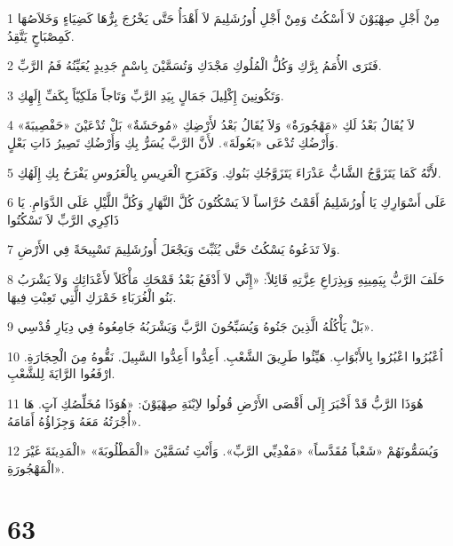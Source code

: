 \par 1 مِنْ أَجْلِ صِهْيَوْنَ لاَ أَسْكُتُ وَمِنْ أَجْلِ أُورُشَلِيمَ لاَ أَهْدَأُ حَتَّى يَخْرُجَ بِرُّهَا كَضِيَاءٍ وَخَلاَصُهَا كَمِصْبَاحٍ يَتَّقِدُ.
\par 2 فَتَرَى الأُمَمُ بِرَّكِ وَكُلُّ الْمُلُوكِ مَجْدَكِ وَتُسَمَّيْنَ بِاسْمٍ جَدِيدٍ يُعَيِّنُهُ فَمُ الرَّبِّ.
\par 3 وَتَكُونِينَ إِكْلِيلَ جَمَالٍ بِيَدِ الرَّبِّ وَتَاجاً مَلَكِيّاً بِكَفِّ إِلَهِكِ.
\par 4 لاَ يُقَالُ بَعْدُ لَكِ «مَهْجُورَةٌ» وَلاَ يُقَالُ بَعْدُ لأَرْضِكِ «مُوحَشَةٌ» بَلْ تُدْعَيْنَ «حَفْصِيبَةَ» وَأَرْضُكِ تُدْعَى «بَعُولَةَ». لأَنَّ الرَّبَّ يُسَرُّ بِكِ وَأَرْضُكِ تَصِيرُ ذَاتِ بَعْلٍ.
\par 5 لأَنَّهُ كَمَا يَتَزَوَّجُ الشَّابُّ عَذْرَاءَ يَتَزَوَّجُكِ بَنُوكِ. وَكَفَرَحِ الْعَرِيسِ بِالْعَرُوسِ يَفْرَحُ بِكِ إِلَهُكِ.
\par 6 عَلَى أَسْوَارِكِ يَا أُورُشَلِيمُ أَقَمْتُ حُرَّاساً لاَ يَسْكُتُونَ كُلَّ النَّهَارِ وَكُلَّ اللَّيْلِ عَلَى الدَّوَامِ. يَا ذَاكِرِي الرَّبِّ لاَ تَسْكُتُوا
\par 7 وَلاَ تَدَعُوهُ يَسْكُتُ حَتَّى يُثَبِّتَ وَيَجْعَلَ أُورُشَلِيمَ تَسْبِيحَةً فِي الأَرْضِ.
\par 8 حَلَفَ الرَّبُّ بِيَمِينِهِ وَبِذِرَاعِ عِزَّتِهِ قَائِلاً: «إِنِّي لاَ أَدْفَعُ بَعْدُ قَمْحَكِ مَأْكَلاً لأَعْدَائِكِ وَلاَ يَشْرَبُ بَنُو الْغُرَبَاءِ خَمْرَكِ الَّتِي تَعِبْتِ فِيهَا.
\par 9 بَلْ يَأْكُلُهُ الَّذِينَ جَنُوهُ وَيُسَبِّحُونَ الرَّبَّ وَيَشْرَبُهُ جَامِعُوهُ فِي دِيَارِ قُدْسِي».
\par 10 اُعْبُرُوا اعْبُرُوا بِالأَبْوَابِ. هَيِّئُوا طَرِيقَ الشَّعْبِ. أَعِدُّوا أَعِدُّوا السَّبِيلَ. نَقُّوهُ مِنَ الْحِجَارَةِ. ارْفَعُوا الرَّايَةَ لِلشَّعْبِ.
\par 11 هُوَذَا الرَّبُّ قَدْ أَخْبَرَ إِلَى أَقْصَى الأَرْضِ قُولُوا لاِبْنَةِ صِهْيَوْنَ: «هُوَذَا مُخَلِّصُكِ آتٍ. هَا أُجْرَتُهُ مَعَهُ وَجِزَاؤُهُ أَمَامَهُ».
\par 12 وَيُسَمُّونَهُمْ «شَعْباً مُقَدَّساً» «مَفْدِيِّي الرَّبِّ». وَأَنْتِ تُسَمَّيْنَ «الْمَطْلُوبَةَ» «الْمَدِينَةَ غَيْرَ الْمَهْجُورَةِ».

\chapter{63}

